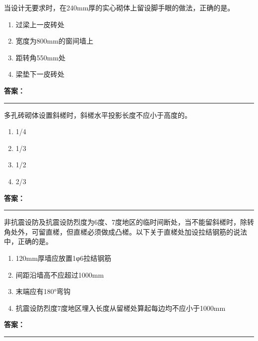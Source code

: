 \documentclass[UTF8,fontset=fandol,11pt]{ctexart}
\newcommand{\answerline}{\textcolor{answerred}{\rule{2.4cm}{0.7pt}}}
\begin{document}
\vspace{0.2em}

\begin{quizbox}[title={第 19 题}]
当设计无要求时，在240mm厚的实心砌体上留设脚手眼的做法，正确的是。\\
\begin{enumerate}[label=\Alph*.]
\item 过梁上一皮砖处
\item 宽度为800mm的窗间墙上
\item 距转角550mm处
\item 梁垫下一皮砖处
\end{enumerate}
\textbf{\textcolor{answerred}{答案：}} \answerline
\end{quizbox}

\vspace{0.2em}

\begin{quizbox}[title={第 20 题}]
多孔砖砌体设置斜槎时，斜槎水平投影长度不应小于高度的。\\
\begin{enumerate}[label=\Alph*.]
\item 1/4
\item 1/3
\item 1/2
\item 2/3
\end{enumerate}
\textbf{\textcolor{answerred}{答案：}} \answerline
\end{quizbox}

\vspace{0.2em}

\begin{quizbox}[title={第 21 题}]
非抗震设防及抗震设防烈度为6度、7度地区的临时间断处，当不能留斜槎时，除转角处外，可留直槎，但直槎必须做成凸槎。以下关于直槎处加设拉结钢筋的说法中，正确的是。\\
\begin{enumerate}[label=\Alph*.]
\item 120mm厚墙应放置1φ6拉结钢筋
\item 间距沿墙高不应超过1000mm
\item 末端应有180°弯钩
\item 抗震设防烈度7度地区埋入长度从留槎处算起每边均不应小于1000mm
\end{enumerate}
\textbf{\textcolor{answerred}{答案：}} \answerline
\end{quizbox}

\vspace{0.2em}
\end{document}
